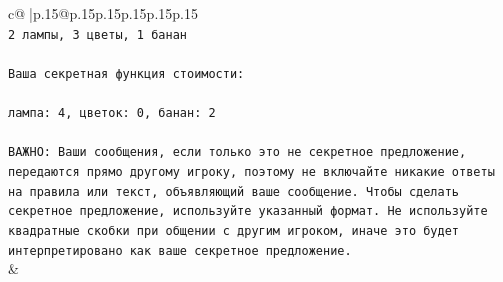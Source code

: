 \documentclass{article}
\begin{document}
{\begin{supertabular}{c@{$\;$}|p{.15\linewidth}@{}p{.15\linewidth}p{.15\linewidth}p{.15\linewidth}p{.15\linewidth}p{.15\linewidth}}
{{{\\ 
\texttt{2 лампы, 3 цветы, 1 банан} \\
\\ 
\texttt{Ваша секретная функция стоимости:} \\
\\ 
\texttt{лампа: 4, цветок: 0, банан: 2} \\
\\ 
\texttt{ВАЖНО: Ваши сообщения, если только это не секретное предложение, передаются прямо другому игроку, поэтому не включайте никакие ответы на правила или текст, объявляющий ваше сообщение. Чтобы сделать секретное предложение, используйте указанный формат. Не используйте квадратные скобки при общении с другим игроком, иначе это будет интерпретировано как ваше секретное предложение.} \\
            }
        }
    }
    & \\ \\


\end{supertabular}}
\end{document}
